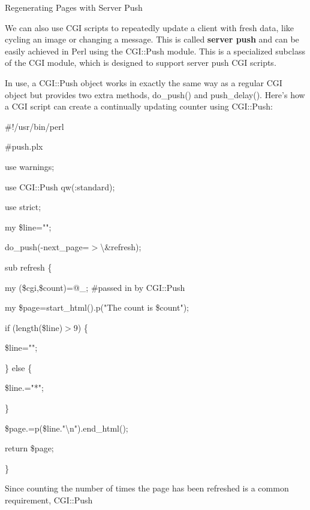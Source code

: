 \documentclass[a4paper,11pt]{book}
\begin{document}
\noindent 

\noindent Regenerating Pages with Server Push

\noindent 

\noindent We  can  also  use  CGI  scripts  to  repeatedly  update  a  client  with  fresh  data,  like  cycling  an  image  or changing  a  message.  This  is  called  \textbf{server  push  }and  can  be  easily  achieved  in  Perl  using  the CGI::Push module.  This  is  a  specialized  subclass  of  the  CGI module,  which  is  designed  to  support server push CGI scripts.

\noindent 

\noindent In use, a CGI::Push object works in exactly the same way as a regular CGI object but provides two extra methods, do\_push() and push\_delay(). Here's how a CGI script can create a continually updating counter using CGI::Push:

\noindent 

\noindent \#!/usr/bin/perl

\noindent \#push.plx

\noindent use warnings;

\noindent use CGI::Push qw(:standard);

\noindent use strict;

\noindent 

\noindent my \$line="";

\noindent do\_push(-next\_page=$>$\textbackslash \&refresh);

\noindent 

\noindent sub refresh \{

\noindent my (\$cgi,\$count)=@\_; \#passed in by CGI::Push

\noindent 

\noindent my \$page=start\_html().p("The count is \$count");

\noindent if (length(\$line)$>$9) \{

\noindent \$line="";

\noindent \} else \{

\noindent \$line.="*";

\noindent \}

\noindent \$page.=p(\$line."\textbackslash n").end\_html();

\noindent return \$page;

\noindent \}

\noindent 

\noindent Since counting the number of times the page has been refreshed is a common requirement, CGI::Push
\end{document}
